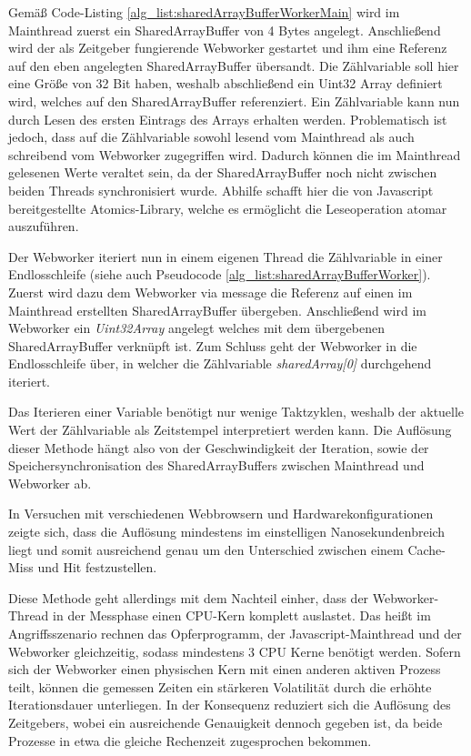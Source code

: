 Gemäß Code-Listing \ref{alg_list:sharedArrayBufferWorkerMain} wird im Mainthread zuerst ein SharedArrayBuffer von 4 Bytes angelegt. Anschließend wird der als Zeitgeber fungierende Webworker gestartet und ihm eine Referenz auf den eben angelegten SharedArrayBuffer übersandt. 
Die Zählvariable soll hier eine Größe von 32 Bit haben, weshalb abschließend ein Uint32 Array definiert wird, welches auf den SharedArrayBuffer referenziert. 
Ein Zählvariable kann nun durch Lesen des ersten Eintrags des Arrays erhalten werden. 
Problematisch ist jedoch, dass auf die Zählvariable sowohl lesend vom Mainthread als auch schreibend vom Webworker zugegriffen wird. 
Dadurch können die im Mainthread gelesenen Werte veraltet sein, da der SharedArrayBuffer noch nicht zwischen beiden Threads synchronisiert wurde. 
Abhilfe schafft hier die von Javascript bereitgestellte Atomics-Library, welche es ermöglicht die Leseoperation atomar auszuführen.

Der Webworker iteriert nun in einem eigenen Thread die Zählvariable in einer Endlosschleife (siehe auch Pseudocode \ref{alg_list:sharedArrayBufferWorker}). 
Zuerst wird dazu dem Webworker via message die Referenz auf einen im Mainthread erstellten SharedArrayBuffer übergeben.
Anschließend wird im Webworker ein \textit{Uint32Array} angelegt welches mit dem übergebenen SharedArrayBuffer verknüpft ist. 
Zum Schluss geht der Webworker in die Endlosschleife über, in welcher die Zählvariable \textit{sharedArray[0]} durchgehend iteriert.

Das Iterieren einer Variable benötigt nur wenige Taktzyklen, weshalb der aktuelle Wert der Zählvariable als Zeitstempel interpretiert werden kann. 
Die Auflösung dieser Methode hängt also von der Geschwindigkeit der Iteration, sowie der Speichersynchronisation des SharedArrayBuffers zwischen Mainthread und Webworker ab.

In Versuchen mit verschiedenen Webbrowsern und Hardwarekonfigurationen zeigte sich, dass die Auflösung mindestens im einstelligen Nanosekundenbreich liegt und somit ausreichend genau um den Unterschied zwischen einem Cache-Miss und Hit festzustellen.

Diese Methode geht allerdings mit dem Nachteil einher, dass der Webworker-Thread in der Messphase einen CPU-Kern komplett auslastet. Das heißt im Angriffsszenario rechnen das Opferprogramm, der Javascript-Mainthread und der Webworker gleichzeitig, sodass mindestens 3 CPU Kerne benötigt werden. 
Sofern sich der Webworker einen physischen Kern mit einen anderen aktiven Prozess teilt, können die gemessen Zeiten ein stärkeren Volatilität durch die erhöhte Iterationsdauer unterliegen.
In der Konsequenz reduziert sich die Auflösung des Zeitgebers, wobei ein ausreichende Genauigkeit dennoch gegeben ist, da beide Prozesse in etwa die gleiche Rechenzeit zugesprochen bekommen.

